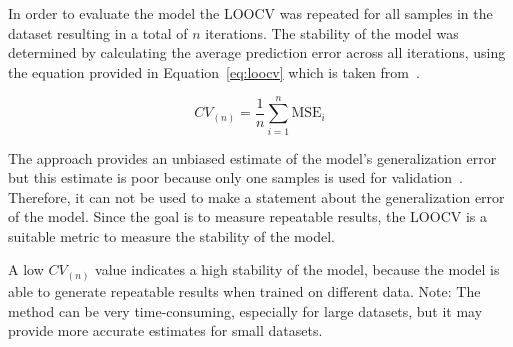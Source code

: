 In order to evaluate the model the \ac{LOOCV} was repeated for all samples in the dataset
resulting in a total of $n$ iterations.
The stability of the model was determined by calculating the average prediction error across all
iterations, using the equation provided in Equation~\ref{eq:loocv} which is taken from~\cite[p.
201]{gareth2013introduction}.

\begin{tcolorbox}[arc=0pt,boxrule=0.5pt]
    \begin{equation}
        CV_{(n)} = \frac{1}{n} \sum_{i=1}^{n} \text{MSE}_{i}\label{eq:loocv}
    \end{equation}
\end{tcolorbox}

The approach provides an unbiased estimate of the model's generalization error
but this estimate is poor because only one samples is used for validation~\cite[p.
201]{gareth2013introduction}.
Therefore, it can not be used to make a statement about the generalization error of the model.
Since the goal is to measure repeatable results, the \ac{LOOCV} is a suitable metric to measure
the stability of the model.

%

A low $CV_{(n)}$ value indicates a high stability of the model, because the model is able to
generate repeatable results when trained on different data.
Note: The method can be very time-consuming, especially for large datasets, but it may provide
more accurate estimates for small datasets.



